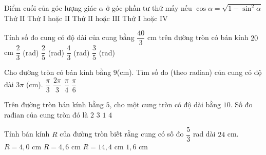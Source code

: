 \begin{ex}%
	Điểm cuối của góc lượng giác  $\alpha$ ở góc phần tư thứ mấy nếu $\cos \alpha =\sqrt{1-\sin^2\alpha}$
	 \choice
		{Thứ $\mathrm{II}  $}
		{Thứ $\mathrm{I}$ hoặc  $\mathrm{II} $}
		{Thứ $\mathrm{II}$ hoặc  $\mathrm{III} $}
		 {\True Thứ $\mathrm{I}$ hoặc $\mathrm{IV} $}
\end{ex}

\begin{ex}%
	Tính số đo cung có độ dài của cung bằng $\dfrac{40}{3}$ cm trên đường tròn có bán  kính $20$ cm
	 \choice
		{\True $\dfrac{2}{3}$ (rad)} 
		{$\dfrac{2}{5}$ (rad)} 
		{$\dfrac{4}{3}$  (rad)}
		 {$\dfrac{3}{5}$ (rad)}
\end{ex}

\begin{ex}%
	Cho đường tròn có bán kính bằng $9$(cm). Tìm số đo (theo radian) của cung  có độ dài $3\pi$ (cm).
	\choice 
		{\True  $\dfrac{\pi}{3}$}
		{$\dfrac{2\pi}{3}$} 
		{$\dfrac{\pi}{4}$} 
		{$\dfrac{\pi}{6}$} 
	\loigiai{ 
		\[l=R\alpha \Rightarrow \alpha=\dfrac{l}{R}=\dfrac{3\pi}{9}=\dfrac{\pi}{3}. 
		\] 
	 }
\end{ex}

\begin{ex}%
	Trên đường tròn bán kính bằng $5$, cho một cung tròn có độ dài bằng  $ 10$. Số đo rađian của cung tròn đó là
	 \choice
		{\True  $2$}
		 {$3$}
		 {$1$}
		 {$4$}
\end{ex}

\begin{ex}%
	Tính bán  kính $R$ của đường tròn biết rằng cung có số đo $\dfrac{5}{3}$ rad dài $24$ cm.
	 \choice
		{$R=4{,}0$ cm} 
		{$R=4{,}6$ cm} 
		{\True $R=14{,}4$ cm} 
		 {$1{,}6$ cm}
\end{ex}

